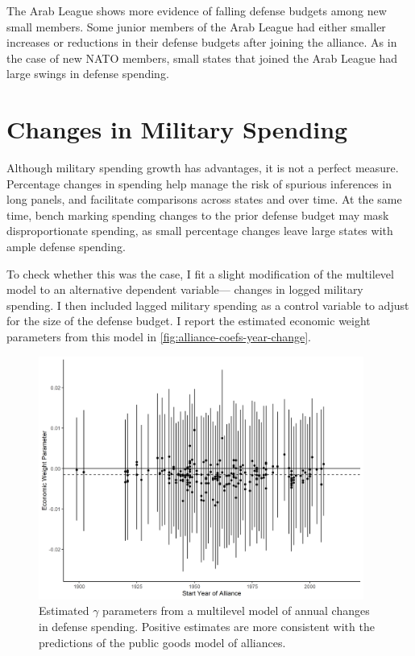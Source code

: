 \documentclass[12pt]{article}
\begin{document}
The Arab League shows more evidence of falling defense budgets among new small members. 
Some junior members of the Arab League had either smaller increases or reductions in their defense budgets after joining the alliance. 
As in the case of new NATO members, small states that joined the Arab League had large swings in defense spending. 




\section{Changes in Military Spending}


Although military spending growth has advantages, it is not a perfect measure. 
Percentage changes in spending help manage the risk of spurious inferences in long panels, and facilitate comparisons across states and over time. 
At the same time, bench marking spending changes to the prior defense budget may mask disproportionate spending, as small percentage changes leave large states with ample defense spending. 


To check whether this was the case, I fit a slight modification of the multilevel model to an alternative dependent variable--- changes in logged military spending. 
I then included lagged military spending as a control variable to adjust for the size of the defense budget. 
I report the estimated economic weight parameters from this model in \autoref{fig:alliance-coefs-year-change}. 


\begin{figure}[htbp]
	\centering
		\includegraphics[width=0.95\textwidth]{alliance-coefs-year-change.png}
	\caption{Estimated $\gamma$ parameters from a multilevel model of annual changes in defense spending. Positive estimates are more consistent with the predictions of the public goods model of alliances.}
	\label{fig:alliance-coefs-year-change}
\end{figure}
\end{document}
